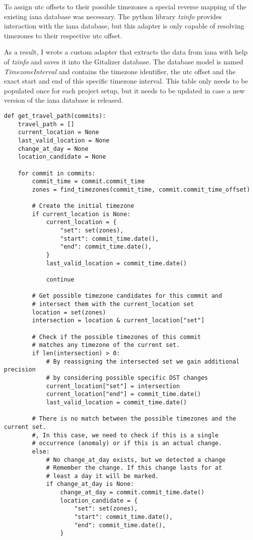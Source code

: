 To assign \ac{utc} offsets to their possible timezones a special reverse mapping of the existing \ac{iana} database was necessary.
The python library \emph{tzinfo} provides interaction with the \ac{iana} database, but this adapter is only capable of resolving timezones to their respective \ac{utc} offset.

As a result, I wrote a custom adapter that extracts the data from \ac{iana} with help of \emph{tzinfo} and saves it into the Gitalizer database.
The database model is named \emph{TimezoneInterval} and contains the timezone identifier, the \ac{utc} offset and the exact start and end of this specific timezone interval.
This table only needs to be populated once for each project setup, but it needs to be updated in case a new version of the \ac{iana} database is released.


\begin{verbatim}
def get_travel_path(commits):
    travel_path = []
    current_location = None
    last_valid_location = None
    change_at_day = None
    location_candidate = None

    for commit in commits:
        commit_time = commit.commit_time
        zones = find_timezones(commit_time, commit.commit_time_offset)

        # Create the initial timezone
        if current_location is None:
            current_location = {
                "set": set(zones),
                "start": commit_time.date(),
                "end": commit_time.date(),
            }
            last_valid_location = commit_time.date()

            continue

        # Get possible timezone candidates for this commit and
        # intersect them with the current_location set
        location = set(zones)
        intersection = location & current_location["set"]

        # Check if the possible timezones of this commit
        # matches any timezone of the current set.
        if len(intersection) > 0:
            # By reassigning the intersected set we gain additional precision
            # by considering possible specific DST changes
            current_location["set"] = intersection
            current_location["end"] = commit_time.date()
            last_valid_location = commit_time.date()

        # There is no match between the possible timezones and the current set.
        #, In this case, we need to check if this is a single
        # occurrence (anomaly) or if this is an actual change.
        else:
            # No change_at_day exists, but we detected a change
            # Remember the change. If this change lasts for at
            # least a day it will be marked.
            if change_at_day is None:
                change_at_day = commit.commit_time.date()
                location_candidate = {
                    "set": set(zones),
                    "start": commit_time.date(),
                    "end": commit_time.date(),
                }


\end{verbatim}
